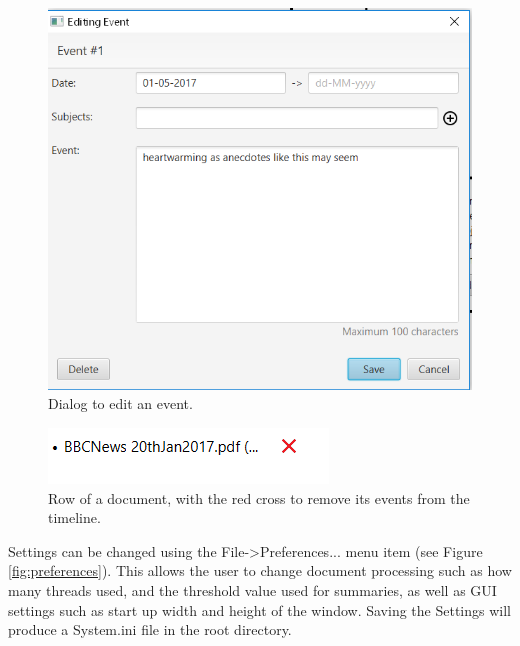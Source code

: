 \begin{figure}[H]
\caption{Dialog to edit an event.}
\label{fig:editEvent}
\includegraphics{editEvent.PNG}
\centering
\end{figure}

\begin{figure}[H]
\caption{Row of a document, with the red cross to remove its events from the timeline.}
\label{fig:removeDoc}
\includegraphics{removeDoc.PNG}
\centering
\end{figure}

\par Settings can be changed using the File->Preferences... menu item (see Figure \ref{fig:preferences}). This allows the user to change document processing such as how many threads used, and the threshold value used for summaries, as well as GUI settings such as start up width and height of the window. Saving the Settings will produce a System.ini file in the root directory.

